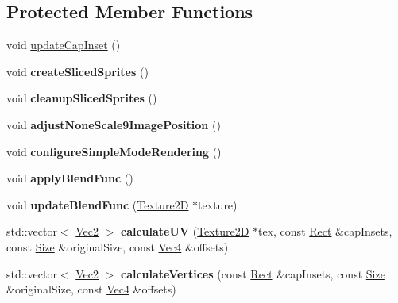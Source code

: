\subsection*{Protected Member Functions}
\begin{DoxyCompactItemize}
\item 
void \hyperlink{classui_1_1Scale9Sprite_af3e2f3817d4b639649c8ce063c437e5b}{update\+Cap\+Inset} ()
\item 
\mbox{\label{classui_1_1Scale9Sprite_a583e673918bbb24ccd83983501012bf2}} 
void {\bfseries create\+Sliced\+Sprites} ()
\item 
\mbox{\label{classui_1_1Scale9Sprite_ae7a40939516f42c7c820da0e43d36d94}} 
void {\bfseries cleanup\+Sliced\+Sprites} ()
\item 
\mbox{\label{classui_1_1Scale9Sprite_aa9b363bd1a03cfa62f259e8cee22b8a0}} 
void {\bfseries adjust\+None\+Scale9\+Image\+Position} ()
\item 
\mbox{\label{classui_1_1Scale9Sprite_ad849a5d814876ecb6e89ee355e011f57}} 
void {\bfseries configure\+Simple\+Mode\+Rendering} ()
\item 
\mbox{\label{classui_1_1Scale9Sprite_a3d1f8feb5e0afee5c0aed4f3601fd839}} 
void {\bfseries apply\+Blend\+Func} ()
\item 
\mbox{\label{classui_1_1Scale9Sprite_aaab1d905ebd84829f5d7f6e203f9d7a3}} 
void {\bfseries update\+Blend\+Func} (\hyperlink{classTexture2D}{Texture2D} $\ast$texture)
\item 
\mbox{\label{classui_1_1Scale9Sprite_afeb8cede5bec1b4f414a1e6a566537a7}} 
std\+::vector$<$ \hyperlink{classVec2}{Vec2} $>$ {\bfseries calculate\+UV} (\hyperlink{classTexture2D}{Texture2D} $\ast$tex, const \hyperlink{classRect}{Rect} \&cap\+Insets, const \hyperlink{classSize}{Size} \&original\+Size, const \hyperlink{classVec4}{Vec4} \&offsets)
\item 
\mbox{\label{classui_1_1Scale9Sprite_ad539fda1816320e48f2e297a5b3f123d}} 
std\+::vector$<$ \hyperlink{classVec2}{Vec2} $>$ {\bfseries calculate\+Vertices} (const \hyperlink{classRect}{Rect} \&cap\+Insets, const \hyperlink{classSize}{Size} \&original\+Size, const \hyperlink{classVec4}{Vec4} \&offsets)

\end{DoxyCompactItemize}
